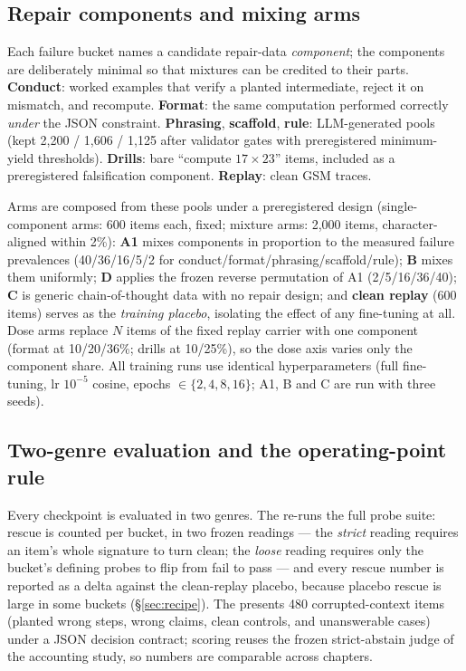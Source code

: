 \subsection{Repair components and mixing arms}
\label{sec:arms}

Each failure bucket names a candidate repair-data \emph{component}; the
components are deliberately minimal so that mixtures can be credited to their
parts. \textbf{Conduct}: worked examples that verify a planted intermediate,
reject it on mismatch, and recompute. \textbf{Format}: the same computation
performed correctly \emph{under} the JSON constraint. \textbf{Phrasing},
\textbf{scaffold}, \textbf{rule}: LLM-generated pools (kept 2{,}200 / 1{,}606
/ 1{,}125 after validator gates with preregistered minimum-yield thresholds).
\textbf{Drills}: bare ``compute $17\times23$'' items, included as a
preregistered falsification component. \textbf{Replay}: clean GSM traces.

Arms are composed from these pools under a preregistered design
(single-component arms: 600 items each, fixed; mixture arms: 2{,}000 items,
character-aligned within 2\%): \textbf{A1} mixes components in proportion to
the measured failure prevalences (40/36/16/5/2 for
conduct/format/phrasing/scaffold/rule); \textbf{B} mixes them uniformly;
\textbf{D} applies the frozen reverse permutation of A1 (2/5/16/36/40);
\textbf{C} is generic chain-of-thought data with no repair design; and
\textbf{clean replay} (600 items) serves as the \emph{training placebo},
isolating the effect of any fine-tuning at all. Dose arms replace $N$ items of
the fixed replay carrier with one component (format at 10/20/36\%; drills at
10/25\%), so the dose axis varies only the component share.
All training runs use identical hyperparameters (full fine-tuning, lr
$10^{-5}$ cosine, epochs $\in\{2,4,8,16\}$; A1, B and C are run with three
seeds).

\subsection{Two-genre evaluation and the operating-point rule}
\label{sec:eval}

Every checkpoint is evaluated in two genres. The \plaingenre{} re-runs the
full probe suite: rescue is counted per bucket, in two frozen readings --- the
\emph{strict} reading requires an item's whole signature to turn clean; the
\emph{loose} reading requires only the bucket's defining probes to flip from
fail to pass --- and every rescue number is reported as a delta against the
clean-replay placebo, because placebo rescue is large in some buckets
(\S\ref{sec:recipe}). The \repairgenre{} presents 480 corrupted-context items
(planted wrong steps, wrong claims, clean controls, and unanswerable cases)
under a JSON decision contract; scoring reuses the frozen strict-abstain judge
of the accounting study, so numbers are comparable across chapters.

